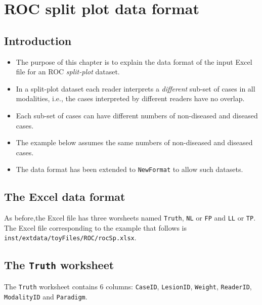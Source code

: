 \documentclass[
]{book}
\providecommand{\tightlist}{%
  \setlength{\itemsep}{0pt}\setlength{\parskip}{0pt}}
\begin{document}
\hypertarget{rocSpdataformat}{%
\chapter{ROC split plot data format}\label{rocSpdataformat}}

\hypertarget{introduction-3}{%
\section{Introduction}\label{introduction-3}}

\begin{itemize}
\tightlist
\item
  The purpose of this chapter is to explain the data format of the input Excel file for an ROC \emph{split-plot} dataset.
\item
  In a split-plot dataset each reader interprets a \emph{different} sub-set of cases in all modalities, i.e., the cases interpreted by different readers have no overlap.
\item
  Each sub-set of cases can have different numbers of non-diseased and diseased cases.
\item
  The example below assumes the same numbers of non-diseased and diseased cases.
\item
  The data format has been extended to \texttt{NewFormat} to allow such datasets.
\end{itemize}

\hypertarget{the-excel-data-format-2}{%
\section{The Excel data format}\label{the-excel-data-format-2}}

As before,the Excel file has three worsheets named \texttt{Truth}, \texttt{NL} or \texttt{FP} and \texttt{LL} or \texttt{TP}. The Excel file corresponding to the example that follows is \texttt{inst/extdata/toyFiles/ROC/rocSp.xlsx}.

\hypertarget{the-truth-worksheet-2}{%
\section{\texorpdfstring{The \texttt{Truth} worksheet}{The Truth worksheet}}\label{the-truth-worksheet-2}}

The \texttt{Truth} worksheet contains 6 columns: \texttt{CaseID}, \texttt{LesionID}, \texttt{Weight}, \texttt{ReaderID}, \texttt{ModalityID} and \texttt{Paradigm}.
\end{document}
